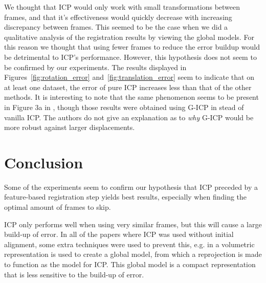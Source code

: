 \documentclass[a4paper]{article}
\begin{document}
We thought that \ac{ICP} would only work with small transformations between frames, and that it's effectiveness would quickly decrease with increasing discrepancy between frames. This seemed to be the case when we did a qualitative analysis of the registration results by viewing the global models. For this reason we thought that using fewer frames to reduce the error buildup would be detrimental to \ac{ICP}'s performance. However, this hypothesis does not seem to be confirmed by our experiments. The results displayed in Figures~\ref{fig:rotation_error} and~\ref{fig:translation_error} seem to indicate that on at least one dataset, the error of pure \ac{ICP} increases less than that of the other methods. It is interesting to note that the same phenomenon seems to be present in Figure 3a in \cite{steinbruecker_sturm_cremers_iccv11}, though those results were obtained using G-ICP in stead of vanilla \ac{ICP}. The authors do not give an explanation as to \emph{why} G-ICP would be more robust against larger displacements.


\section{Conclusion}
Some of the experiments seem to confirm our hypothesis that \ac{ICP} preceded by a feature-based registration step yields best results, especially when finding the optimal amount of frames to skip.

\ac{ICP} only performs well when using very similar frames, but this will cause a large build-up of error. In all of the papers where \ac{ICP} was used without initial alignment, some extra techniques were used to prevent this, e.g. in \cite{izadi2011kinectfusion} a volumetric representation is used to create a global model, from which a reprojection is made to function as the model for \ac{ICP}. This global model is a compact representation that is less sensitive to the build-up of error.


{}

\end{document}
